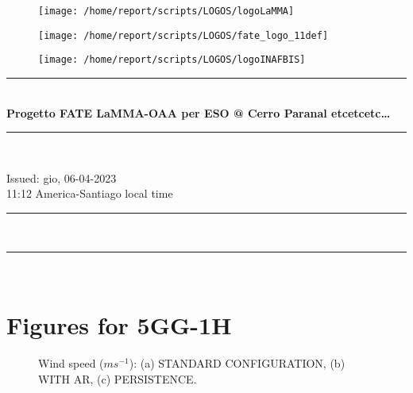 \documentclass[11pt,english]{article}
\newcommand{\HRule}{\rule{\linewidth}{0.5mm}}
\begin{document}
\begin{figure}
\begin{center}
\hspace{1.5cm}
\parbox{5.5cm}{\texttt{[image: /home/report/scripts/LOGOS/logoLaMMA]}}
\hspace{.3cm}
\parbox{5.5cm}{\texttt{[image: /home/report/scripts/LOGOS/fate\_logo\_11def]}}
\hspace{.3cm}
\parbox{5.5cm}{\texttt{[image: /home/report/scripts/LOGOS/logoINAFBIS]}}
\hspace{.1cm}
\vspace{1.2cm}
\end{center}
\end{figure}

\begin{center}
\HRule \\[0.4cm]
\Huge{\textbf{Progetto FATE LaMMA-OAA per ESO @ Cerro Paranal etcetcetc\ldots}}
\HRule \\[0.4cm]
\end{center}

\begin{center}
\vspace{2cm}\Huge{Issued: gio, 06-04-2023\\ 11:12 America-Santiago local time}
\end{center}

\begin{center}
\HRule \\[0.1cm]
\tableofcontents
\HRule \\[0.1cm]
\end{center}
\newpage
\clearpage
\section{Figures for 5GG-1H}

\clearpage
\begin{figure}
\begin{minipage}{.5\linewidth}
\centering
{}
\end{minipage}%
\begin{minipage}{.5\linewidth}
\centering
{}
\end{minipage}\par\medskip
\centering
{}
\caption{Wind speed ($m s^{-1}$): (a) STANDARD CONFIGURATION, (b) WITH AR, (c) PERSISTENCE.}
\label{fig:ws}
\end{figure}
\end{document}
